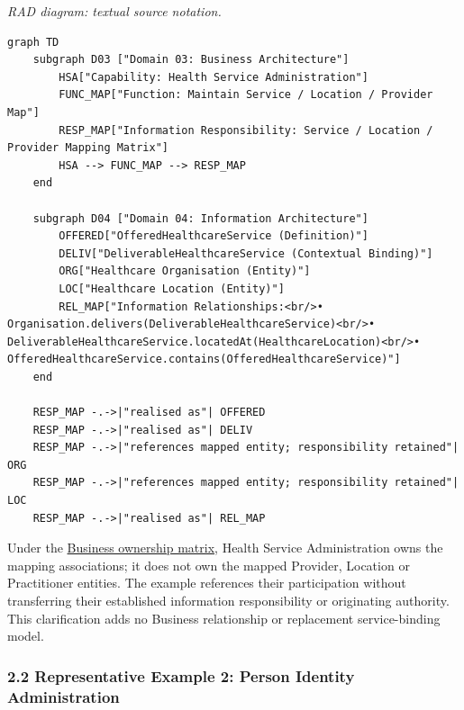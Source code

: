 \textit{RAD diagram: textual source notation.}
\begin{Verbatim}[breaklines,fontsize=\footnotesize]
graph TD
    subgraph D03 ["Domain 03: Business Architecture"]
        HSA["Capability: Health Service Administration"]
        FUNC_MAP["Function: Maintain Service / Location / Provider Map"]
        RESP_MAP["Information Responsibility: Service / Location / Provider Mapping Matrix"]
        HSA --> FUNC_MAP --> RESP_MAP
    end

    subgraph D04 ["Domain 04: Information Architecture"]
        OFFERED["OfferedHealthcareService (Definition)"]
        DELIV["DeliverableHealthcareService (Contextual Binding)"]
        ORG["Healthcare Organisation (Entity)"]
        LOC["Healthcare Location (Entity)"]
        REL_MAP["Information Relationships:<br/>• Organisation.delivers(DeliverableHealthcareService)<br/>• DeliverableHealthcareService.locatedAt(HealthcareLocation)<br/>• OfferedHealthcareService.contains(OfferedHealthcareService)"]
    end

    RESP_MAP -.->|"realised as"| OFFERED
    RESP_MAP -.->|"realised as"| DELIV
    RESP_MAP -.->|"references mapped entity; responsibility retained"| ORG
    RESP_MAP -.->|"references mapped entity; responsibility retained"| LOC
    RESP_MAP -.->|"realised as"| REL_MAP
\end{Verbatim}
\label{rad:traceability:86}

Under the \href{https://github.com/fhirfactory/harmonia/blob/98410db60155198a75f74c79d98060070209faa1/docs/markdown/03-business-architecture/information-responsibility/information-responsibility.md\#2-canonical-business-information-ownership-matrix}{Business ownership matrix}, Health Service Administration owns the mapping associations; it does not own the mapped Provider, Location or Practitioner entities. The example references their participation without transferring their established information responsibility or originating authority. This clarification adds no Business relationship or replacement service-binding model.

\label{rad:traceability:88}
\subsubsection*{2.2 Representative Example 2: Person Identity Administration}
\label{rad:traceability:90}

